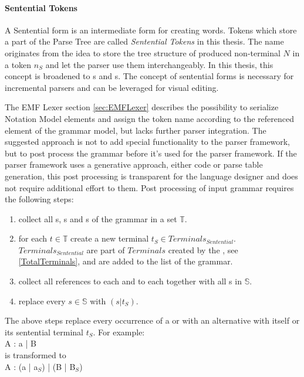 \paragraph{Sentential Tokens} \label{SententialTokens}
A Sentential form is an intermediate form for creating words. Tokens which store a part of the Parse Tree are called \emph{Sentential Tokens} in this thesis. The name originates from the idea to store the tree structure of produced non-terminal $N$ in a token $n_S$ and let the parser use them interchangeably. In this thesis, this concept is broadened to s and s. The concept of sentential forms is necessary for incremental parsers and can be leveraged for visual editing.
 
The EMF Lexer section \ref{sec:EMFLexer} describes the possibility to serialize Notation Model elements and assign the token name according to the referenced element of the grammar model, but lacks further parser integration. The suggested approach is not to add special functionality to the parser framework, but to post process the grammar before it's used for the parser framework. If the parser framework uses a generative approach, either code or parse table generation, this post processing is transparent for the language designer and does not require additional effort to them. 
Post processing of input grammar requires the following steps:
\begin{enumerate}
	\item collect all s, s and s of the grammar in a set $\mathbb{T}$.
	\item for each $t \in \mathbb{T}$ create a new terminal $t_S \in Terminals_{Sentential}$.\\ $Terminals_{Sentential}$ are part of $Terminals$ created by the , see \ref{TotalTerminals}, and are added to the  list of the grammar.
	\item collect all references to each  and to each  together with all s in $\mathbb{S}$.
	\item replace every $s \in \mathbb{S}$ with $(s | t_S)$. \label{SententialTokenSubstitution}
\end{enumerate}
  
The above steps replace every occurrence of a  or  with an alternative with itself or its sentential terminal $t_S$. 
For example:\\
A : a | B \\
is transformed to  \\
A : (a | a$_S$) | (B | B$_S$)


